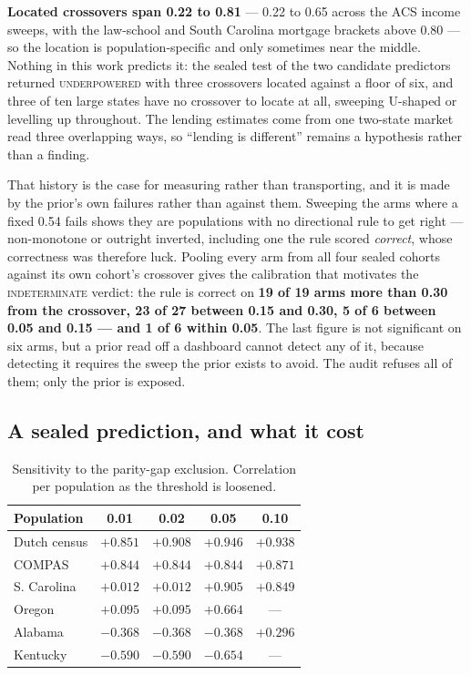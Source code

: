 \documentclass[conference]{IEEEtran}
\begin{document}
\textbf{Located crossovers span 0.22 to 0.81} --- 0.22 to 0.65 across
the ACS income sweeps, with the law-school and South Carolina mortgage brackets above 0.80 ---
so the location is population-specific and only sometimes near the middle. Nothing in this work
predicts it: the sealed test of the two candidate predictors returned \textsc{underpowered}
with three crossovers located against a floor of six, and three of ten large states have no
crossover to locate at all, sweeping U-shaped or levelling up throughout. The lending
estimates come from one two-state market read three overlapping ways, so ``lending is
different'' remains a hypothesis rather than a finding.

That history is the case for measuring rather than transporting, and it is made by the prior's
own failures rather than against them. Sweeping the arms where a fixed 0.54 fails shows they
are populations with no directional rule to get right --- non-monotone or outright inverted,
including one the rule scored \emph{correct}, whose correctness was therefore luck. Pooling every arm from all four sealed cohorts against its own cohort's crossover gives the
calibration that motivates the \textsc{indeterminate} verdict: the rule is correct on
\textbf{19 of 19 arms more than 0.30 from the crossover, 23 of 27 between 0.15 and 0.30, 5 of
6 between 0.05 and 0.15 --- and 1 of 6 within 0.05}. The last figure is not significant on six
arms, but a prior read off a dashboard cannot detect any of it, because detecting it requires
the sweep the prior exists to avoid. The audit refuses all of them; only the prior is exposed.

\subsection{A sealed prediction, and what it cost}
\label{sec:sealed}

\begin{table}[!t]
\caption{Sensitivity to the parity-gap exclusion. Correlation per population as the
threshold is loosened.}
\label{tab:sensitivity}
\centering
\footnotesize
\setlength{\tabcolsep}{5pt}
\begin{tabular}{@{}lcccc@{}}
\toprule
\textbf{Population} & \textbf{0.01} & \textbf{0.02} & \textbf{0.05} & \textbf{0.10} \\
\midrule
Dutch census & $+0.851$ & $+0.908$ & $+0.946$ & $+0.938$ \\
COMPAS & $+0.844$ & $+0.844$ & $+0.844$ & $+0.871$ \\
S. Carolina & $+0.012$ & $+0.012$ & $+0.905$ & $+0.849$ \\
Oregon & $+0.095$ & $+0.095$ & $+0.664$ & --- \\
Alabama & $-0.368$ & $-0.368$ & $-0.368$ & $+0.296$ \\
Kentucky & $-0.590$ & $-0.590$ & $-0.654$ & --- \\
\bottomrule
\end{tabular}
\end{table}
\end{document}
